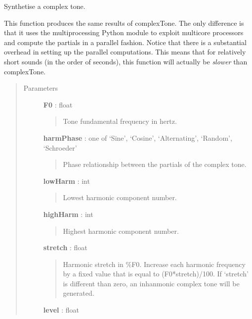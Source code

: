 \documentclass[a4paper,12pt,english]{sphinxmanual}
\begin{document}

\begin{fulllineitems}
\label{sndlib:sndlib.complexToneParallel}
Synthetise a complex tone.

This function produces the same results of complexTone. The only difference
is that it uses the multiprocessing Python module to exploit multicore
processors and compute the partials in a parallel fashion. Notice that
there is a substantial overhead in setting up the parallel computations.
This means that for relatively short sounds (in the order of seconds),
this function will actually be \emph{slower} than complexTone.
\begin{quote}\begin{description}
\item[{Parameters }] \leavevmode
\textbf{F0} : float
\begin{quote}

Tone fundamental frequency in hertz.
\end{quote}

\textbf{harmPhase} : one of `Sine', `Cosine', `Alternating', `Random', `Schroeder'
\begin{quote}

Phase relationship between the partials of the complex tone.
\end{quote}

\textbf{lowHarm} : int
\begin{quote}

Lowest harmonic component number.
\end{quote}

\textbf{highHarm} : int
\begin{quote}

Highest harmonic component number.
\end{quote}

\textbf{stretch} : float
\begin{quote}

Harmonic stretch in \%F0. Increase each harmonic frequency by a fixed value
that is equal to (F0*stretch)/100. If `stretch' is different than
zero, an inhanmonic complex tone will be generated.
\end{quote}

\textbf{level} : float
\begin{quote}


\end{quote}
\end{description}
\end{quote}
\end{fulllineitems}
\end{document}
